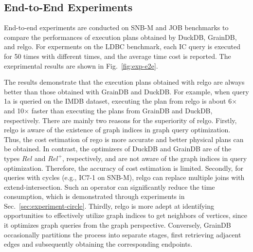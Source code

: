 \subsection{End-to-End Experiments}
\label{sec:experiment-e2e}

End-to-end experiments are conducted on SNB-M and JOB benchmarks to compare the performances of execution plans obtained by DuckDB, GrainDB, and relgo.
For experments on the LDBC benchmark, each IC query is executed for 50 times with different times, and the average time cost is reported.
The exeprimental results are shown in Fig.~\ref{fig:exp-e2e}.

The results demonstrate that the execution plans obtained with relgo are always better than those obtained with GrainDB and DuckDB.
For example, when query 1a is queried on the IMDB dataset, executing the plan from relgo is about 6$\times$ and 10$\times$ faster than executing the plans from GrainDB and DuckDB, respectively.
There are mainly two reasons for the superiority of relgo.
Firstly, relgo is aware of the existence of graph indices in graph query optimization.
Thus, the cost estimation of rego is more accurate and better physical plans can be obtained.
In contrast, the optimizers of DuckDB and GrainDB are of the types $Rel$ and $Rel^+$, respectively, and are not aware of the graph indices in query optimization.
Therefore, the accuracy of cost estimation is limited.
Secondly, for queries with cycles (e.g., IC7-1 on SNB-M), relgo can replace multiple joins with extend-intersection.
Such an operator can significantly reduce the time consumption, which is demonstrated through experiments in Sec.~\ref{sec:experiment-circle}.
Thirdly, relgo is more adept at identifying opportunities to effectively utilize graph indices to get neighbors of vertices, since it optimizes graph queries from the graph perspective.
Conversely, GrainDB occasionally partitions the process into separate stages, first retrieving adjacent edges and subsequently obtaining the corresponding endpoints.


